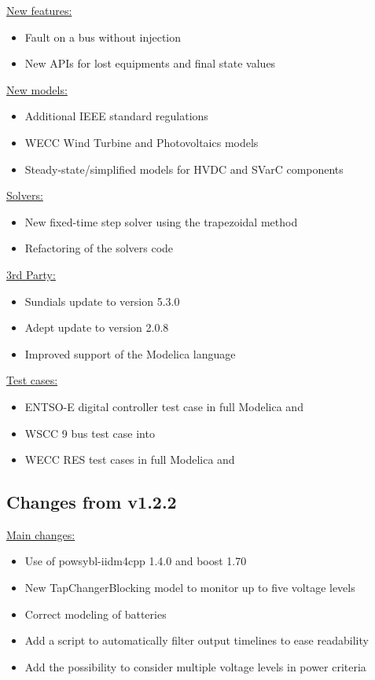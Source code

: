 \documentclass[a4paper, 12pt]{report}
\begin{document}
\underline{New features:}
\begin{itemize}
\item Fault on a bus without injection
\item New APIs for lost equipments and final state values
\end{itemize}

\underline{New models:}
\begin{itemize}
\item Additional IEEE standard regulations
\item WECC Wind Turbine and Photovoltaics models
\item Steady-state/simplified models for HVDC and SVarC components
\end{itemize}

\underline{Solvers:}
\begin{itemize}
\item New fixed-time step solver using the trapezoidal method
\item Refactoring of the solvers code
\end{itemize}

\underline{3rd Party:}
\begin{itemize}
\item Sundials update to version 5.3.0
\item Adept update to version 2.0.8
\item Improved support of the Modelica language
\end{itemize}

\underline{Test cases:}
\begin{itemize}
\item ENTSO-E digital controller test case in full Modelica and \Dynawo
\item WSCC 9 bus test case into \Dynawo
\item WECC RES test cases in full Modelica and \Dynawo
\end{itemize}


\subsection{Changes from v1.2.2}

\underline{Main changes:}
\begin{itemize}
\item Use of powsybl-iidm4cpp 1.4.0 and boost 1.70
\item New TapChangerBlocking model to monitor up to five voltage levels
\item Correct modeling of batteries
\item Add a script to automatically filter output timelines to ease readability
\item Add the possibility to consider multiple voltage levels in power criteria
\end{itemize}
\end{document}
